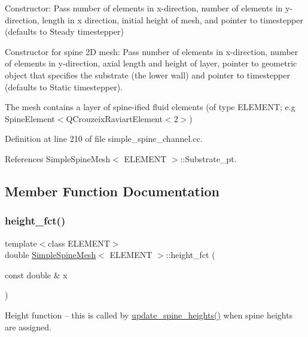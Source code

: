 Constructor\+: Pass number of elements in x-\/direction, number of elements in y-\/direction, length in x direction, initial height of mesh, and pointer to timestepper (defaults to Steady timestepper) 

Constructor for spine 2D mesh\+: Pass number of elements in x-\/direction, number of elements in y-\/direction, axial length and height of layer, pointer to geometric object that specifies the substrate (the lower wall) and pointer to timestepper (defaults to Static timestepper).

The mesh contains a layer of spine-\/ified fluid elements (of type E\+L\+E\+M\+E\+NT; e.\+g Spine\+Element$<$Q\+Crouzeix\+Raviart\+Element$<$2$>$) 

Definition at line 210 of file simple\+\_\+spine\+\_\+channel.\+cc.



References Simple\+Spine\+Mesh$<$ E\+L\+E\+M\+E\+N\+T $>$\+::\+Substrate\+\_\+pt.



\subsection{Member Function Documentation}
\mbox{\label{classSimpleSpineMesh_a99398fc7ef50db36d30f6c1d01aa3758}} 
\subsubsection{\texorpdfstring{height\+\_\+fct()}{height\_fct()}}
{\footnotesize\ttfamily template$<$class E\+L\+E\+M\+E\+NT$>$ \\
double \hyperlink{classSimpleSpineMesh}{Simple\+Spine\+Mesh}$<$ E\+L\+E\+M\+E\+NT $>$\+::height\+\_\+fct (\begin{DoxyParamCaption}\item[{const double \&}]{x }\end{DoxyParamCaption})\hspace{0.3cm}{\ttfamily [inline]}}



Height function -- this is called by \hyperlink{classSimpleSpineMesh_a2248fb8df448b0a02377a0cfb6f57851}{update\+\_\+spine\+\_\+heights()} when spine heights are assigned. 



